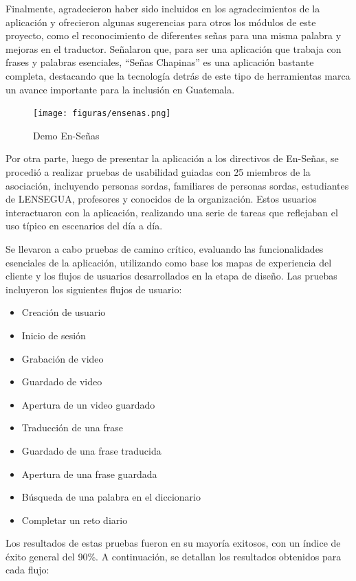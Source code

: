 Finalmente, agradecieron haber sido incluidos en los agradecimientos de la aplicación y ofrecieron algunas sugerencias para otros los módulos de este proyecto, como el reconocimiento de diferentes señas para una misma palabra y mejoras en el traductor. Señalaron que, para ser una aplicación que trabaja con frases y palabras esenciales, ``Señas Chapinas'' es una aplicación bastante completa, destacando que la tecnología detrás de este tipo de herramientas marca un avance importante para la inclusión en Guatemala.


\begin{figure}  [H]
    \centering
    \texttt{[image: figuras/ensenas.png]}
    \caption{Demo En-Señas}
    \label{fig:enter-label}
\end{figure}

Por otra parte, luego de presentar la aplicación a los directivos de En-Señas, se procedió a realizar pruebas de usabilidad guiadas con 25 miembros de la asociación, incluyendo personas sordas, familiares de personas sordas, estudiantes de LENSEGUA, profesores y conocidos de la organización. Estos usuarios interactuaron con la aplicación, realizando una serie de tareas que reflejaban el uso típico en escenarios del día a día.

Se llevaron a cabo pruebas de camino crítico, evaluando las funcionalidades esenciales de la aplicación, utilizando como base los mapas de experiencia del cliente y los flujos de usuarios desarrollados en la etapa de diseño. Las pruebas incluyeron los siguientes flujos de usuario:

\begin{itemize}
    \item Creación de usuario
    \item Inicio de sesión
    \item Grabación de video
    \item Guardado de video
    \item Apertura de un video guardado
    \item Traducción de una frase
    \item Guardado de una frase traducida
    \item Apertura de una frase guardada
    \item Búsqueda de una palabra en el diccionario
    \item Completar un reto diario
\end{itemize}


Los resultados de estas pruebas fueron en su mayoría exitosos, con un índice de éxito general del 90\%. A continuación, se detallan los resultados obtenidos para cada flujo:

